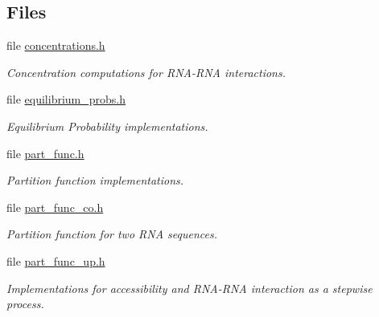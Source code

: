 \subsection*{Files}
\begin{DoxyCompactItemize}
\item 
file \hyperlink{concentrations_8h}{concentrations.\+h}
\begin{DoxyCompactList}\small\item\em Concentration computations for R\+N\+A-\/\+R\+NA interactions. \end{DoxyCompactList}\item 
file \hyperlink{equilibrium__probs_8h}{equilibrium\+\_\+probs.\+h}
\begin{DoxyCompactList}\small\item\em Equilibrium Probability implementations. \end{DoxyCompactList}\item 
file \hyperlink{part__func_8h}{part\+\_\+func.\+h}
\begin{DoxyCompactList}\small\item\em Partition function implementations. \end{DoxyCompactList}\item 
file \hyperlink{part__func__co_8h}{part\+\_\+func\+\_\+co.\+h}
\begin{DoxyCompactList}\small\item\em Partition function for two R\+NA sequences. \end{DoxyCompactList}\item 
file \hyperlink{part__func__up_8h}{part\+\_\+func\+\_\+up.\+h}
\begin{DoxyCompactList}\small\item\em Implementations for accessibility and R\+N\+A-\/\+R\+NA interaction as a stepwise process. \end{DoxyCompactList}\end{DoxyCompactItemize}
